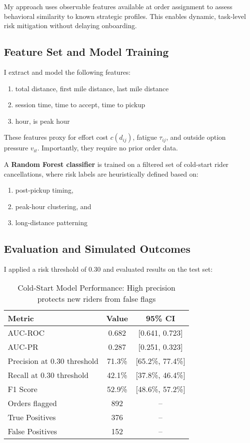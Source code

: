 \documentclass[12pt,letterpaper]{article}
\begin{document}
My approach uses observable features available at order assignment to assess behavioral similarity to known strategic profiles. This enables dynamic, task-level risk mitigation without delaying onboarding.

\subsection{Feature Set and Model Training}

I extract and model the following features:

\begin{enumerate}
    \item total distance, first mile distance, last mile distance
    \item session time, time to accept, time to pickup
    \item hour, is peak hour
\end{enumerate}

These features proxy for effort cost $c(d_{ij})$, fatigue $\tau_{ij}$, and outside option pressure $v_{it}$. Importantly, they require no prior order data.

A \textbf{Random Forest classifier} is trained on a filtered set of cold-start rider cancellations, where risk labels are heuristically defined based on:

\begin{enumerate}
    \item post-pickup timing,
    \item peak-hour clustering, and
    \item long-distance patterning
\end{enumerate}

\subsection{Evaluation and Simulated Outcomes}

I applied a risk threshold of 0.30 and evaluated results on the test set:

\begin{table}[H]
\centering
\caption{Cold-Start Model Performance: High precision protects new riders from false flags}
\label{tab:coldstart_performance}
\begin{tabular}{lcc}
\toprule
Metric & Value & 95\% CI \\
\midrule
AUC-ROC & 0.682 & [0.641, 0.723] \\
AUC-PR & 0.287 & [0.251, 0.323] \\
Precision at 0.30 threshold & 71.3\% & [65.2\%, 77.4\%] \\
Recall at 0.30 threshold & 42.1\% & [37.8\%, 46.4\%] \\
F1 Score & 52.9\% & [48.6\%, 57.2\%] \\
Orders flagged & 892 & -- \\
True Positives & 376 & -- \\
False Positives & 152 & -- \\
\bottomrule
\end{tabular}
\end{table}
\end{document}
